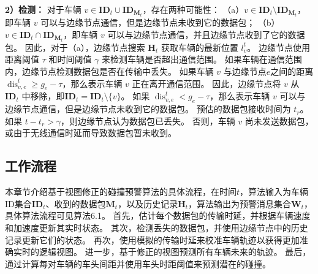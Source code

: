 \textbf{2）检测：}
对于车辆 ${v} \in \mathbf{ID}_{t} \cup \mathbf{ID}_{\mathbf{M}_{t}}$，存在两种可能性：
（a）${v} \in \mathbf{ID}_{t} \setminus \mathbf{ID}_{\mathbf{M}_{t}}$，即车辆 $v$ 可以与边缘节点通信，但是边缘节点未收到它的数据包；
（b）${v} \in \mathbf{ID}_{t} \cap \mathbf{ID}_{\mathbf{M}_{t}}$，即车辆 $v$ 可以与边缘节点通信，并且边缘节点收到了它的数据包。
因此，对于（a），边缘节点搜索 ${\mathbf{H}_{t}}$ 获取车辆的最新位置 $l_v^t$。
边缘节点使用距离阈值 $\tau$ 和时间阈值 $\gamma$ 来检测车辆是否超出通信范围。
如果车辆在通信范围内，边缘节点检测数据包是否在传输中丢失。
如果车辆 $v$ 与边缘节点$e$之间的距离 $\operatorname{dis}_{v, e}^{t} \geq g_e - \tau$，那么表示车辆 $v$ 正在离开通信范围。
因此，边缘节点将 $v$ 从 $\mathbf{ID}_{t}$ 中移除，即$\mathbf{ID}_{t}=\mathbf{ID}_{t} \setminus \{v\}$。
如果 $\operatorname{dis}_{v, e}^{t} < g_e - \tau$，那么表示车辆 $v$ 可以与边缘节点通信，但是边缘节点未收到它的数据包。
预估的数据包接收时间为 $t_r$。如果 $t - t_r > \gamma$，则边缘节点认为数据包已丢失。
否则，车辆 $v$ 尚未发送数据包，或由于无线通信时延而导致数据包暂未收到。

\subsection{工作流程}

本章节介绍基于视图修正的碰撞预警算法的具体流程，在时间$t$，算法输入为车辆ID集合$\mathbf{ID}_{t}$、收到的数据包$\mathbf{M}_{t}$，以及历史记录${\mathbf{H}_{t}}$，算法输出为预警消息集合$\mathbf{W}_{t}$，具体算法流程可见算法6.1。
首先，估计每个数据包的传输时延，并根据车辆速度和加速度更新其实时状态。
其次，检测丢失的数据包，并使用边缘节点中的历史记录更新它们的状态。
再次，使用模拟的传输时延来校准车辆轨迹以获得更加准确实时的逻辑视图。
进一步，基于修正的视图预测所有车辆未来的轨迹。
最后，通过计算每对车辆的车头间距并使用车头时距阈值来预测潜在的碰撞。


